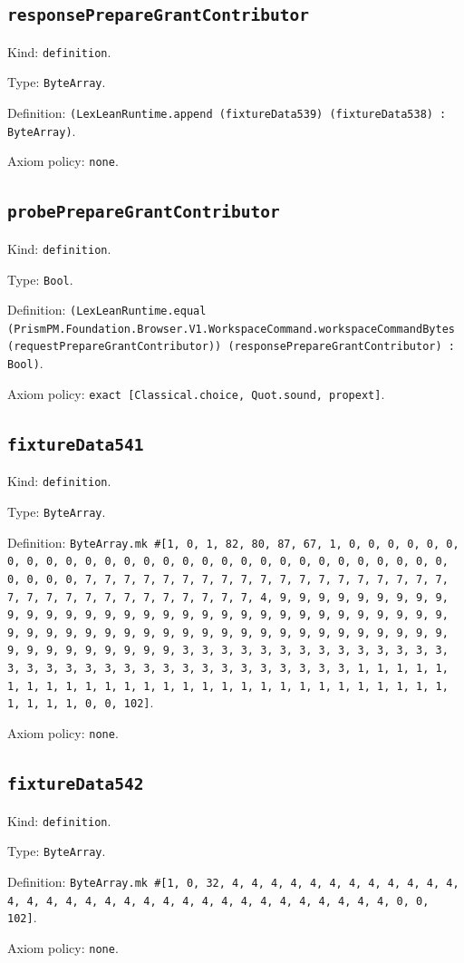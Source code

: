 \documentclass[11pt]{article}
\begin{document}
\subsection*{\texttt{responsePrepareGrantContributor}}
\noindent Kind: \texttt{definition}.\par
\noindent Type: \texttt{ByteArray}.\par
\noindent Definition: \texttt{(LexLeanRuntime.append (fixtureData539) (fixtureData538) : ByteArray)}.\par
\noindent Axiom policy: \texttt{none}.\par
\subsection*{\texttt{probePrepareGrantContributor}}
\noindent Kind: \texttt{definition}.\par
\noindent Type: \texttt{Bool}.\par
\noindent Definition: \texttt{(LexLeanRuntime.equal (PrismPM.Foundation.Browser.V1.WorkspaceCommand.workspaceCommandBytes (requestPrepareGrantContributor)) (responsePrepareGrantContributor) : Bool)}.\par
\noindent Axiom policy: \texttt{exact [Classical.choice, Quot.sound, propext]}.\par
\subsection*{\texttt{fixtureData541}}
\noindent Kind: \texttt{definition}.\par
\noindent Type: \texttt{ByteArray}.\par
\noindent Definition: \texttt{ByteArray.mk \#[1, 0, 1, 82, 80, 87, 67, 1, 0, 0, 0, 0, 0, 0, 0, 0, 0, 0, 0, 0, 0, 0, 0, 0, 0, 0, 0, 0, 0, 0, 0, 0, 0, 0, 0, 0, 0, 0, 0, 0, 0, 7, 7, 7, 7, 7, 7, 7, 7, 7, 7, 7, 7, 7, 7, 7, 7, 7, 7, 7, 7, 7, 7, 7, 7, 7, 7, 7, 7, 7, 7, 7, 7, 4, 9, 9, 9, 9, 9, 9, 9, 9, 9, 9, 9, 9, 9, 9, 9, 9, 9, 9, 9, 9, 9, 9, 9, 9, 9, 9, 9, 9, 9, 9, 9, 9, 9, 9, 9, 9, 9, 9, 9, 9, 9, 9, 9, 9, 9, 9, 9, 9, 9, 9, 9, 9, 9, 9, 9, 9, 9, 9, 9, 9, 9, 9, 9, 9, 3, 3, 3, 3, 3, 3, 3, 3, 3, 3, 3, 3, 3, 3, 3, 3, 3, 3, 3, 3, 3, 3, 3, 3, 3, 3, 3, 3, 3, 3, 3, 3, 1, 1, 1, 1, 1, 1, 1, 1, 1, 1, 1, 1, 1, 1, 1, 1, 1, 1, 1, 1, 1, 1, 1, 1, 1, 1, 1, 1, 1, 1, 1, 1, 0, 0, 102]}.\par
\noindent Axiom policy: \texttt{none}.\par
\subsection*{\texttt{fixtureData542}}
\noindent Kind: \texttt{definition}.\par
\noindent Type: \texttt{ByteArray}.\par
\noindent Definition: \texttt{ByteArray.mk \#[1, 0, 32, 4, 4, 4, 4, 4, 4, 4, 4, 4, 4, 4, 4, 4, 4, 4, 4, 4, 4, 4, 4, 4, 4, 4, 4, 4, 4, 4, 4, 4, 4, 4, 4, 0, 0, 102]}.\par
\noindent Axiom policy: \texttt{none}.\par
\end{document}
